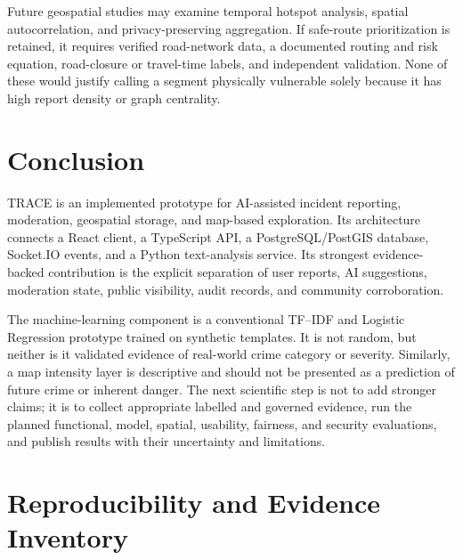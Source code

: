 \documentclass[11pt]{article}
\begin{document}
Future geospatial studies may examine temporal hotspot analysis, spatial
autocorrelation, and privacy-preserving aggregation. If safe-route
prioritization is retained, it requires verified road-network data, a
documented routing and risk equation, road-closure or travel-time labels,
and independent validation. None of these would justify calling a segment
physically vulnerable solely because it has high report density or graph
centrality.

\section{Conclusion}
\label{sec:conclusion}

TRACE is an implemented prototype for AI-assisted incident reporting,
moderation, geospatial storage, and map-based exploration. Its architecture
connects a React client, a TypeScript API, a PostgreSQL/PostGIS database,
Socket.IO events, and a Python text-analysis service. Its strongest
evidence-backed contribution is the explicit separation of user reports,
AI suggestions, moderation state, public visibility, audit records, and
community corroboration.

The machine-learning component is a conventional TF--IDF and Logistic
Regression prototype trained on synthetic templates. It is not random, but
neither is it validated evidence of real-world crime category or severity.
Similarly, a map intensity layer is descriptive and should not be presented
as a prediction of future crime or inherent danger. The next scientific step
is not to add stronger claims; it is to collect appropriate labelled and
governed evidence, run the planned functional, model, spatial, usability,
fairness, and security evaluations, and publish results with their
uncertainty and limitations.

\appendix
\section{Reproducibility and Evidence Inventory}
\label{app:evidence}
\end{document}
